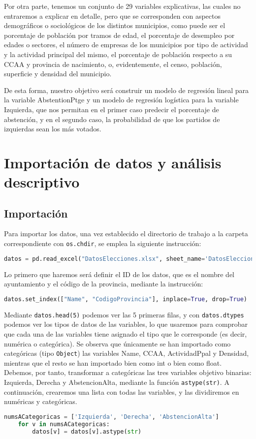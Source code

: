 \documentclass[a4paper,onecolumn]{extarticle}
\begin{document}
\begin{sloppypar}
Por otra parte, tenemos un conjunto de 29 variables explicativas, las cuales no entraremos a explicar en detalle, pero que se corresponden con aspectos 
demográficos o sociológicos de los distintos municipios, como puede ser el porcentaje de población por tramos de edad, el porcentaje de desempleo por edades 
o sectores, el número de empresas de los municipios por tipo de actividad y la actividad principal del mismo, el porcentaje de población respecto a su CCAA 
y provincia de nacimiento, o, evidentemente, el censo, población, superficie y densidad del municipio.

De esta forma, nuestro objetivo será construir un modelo de regresión lineal para la variable AbstentionPtge y un modelo de regresión logística para la 
variable Izquierda, que nos permitan en el primer caso predecir el porcentaje de abstención, y en el segundo caso, la probabilidad de que los partidos de 
izquierdas sean los más votados.

\section{Importación de datos y análisis descriptivo}\label{importacionAnalisis}
\subsection{Importación}\label{importacion}
Para importar los datos, una vez establecido el directorio de trabajo a la carpeta correspondiente con \texttt{os.chdir}, se emplea la siguiente instrucción:
\begin{lstlisting}[language=Python, numbers=none]
    datos = pd.read_excel("DatosElecciones.xlsx", sheet_name='DatosEleccionesEspaña')
\end{lstlisting}

Lo primero que haremos será definir el ID de los datos, que es el nombre del ayuntamiento y el código de la provincia, mediante la instrucción:
\begin{lstlisting}[language=Python,numbers=none]
datos.set_index(["Name", "CodigoProvincia"], inplace=True, drop=True)
\end{lstlisting}

Mediante \texttt{datos.head(5)} podemos ver las 5 primeras filas, y con \texttt{datos.dtypes} podemos ver los tipos de datos de las variables, lo que 
usaremos para comprobar que cada una de las variables tiene asignado el tipo que le corresponde (es decir, numérica o categórica). Se observa que únicamente
se han importado como categóricas (tipo \texttt{Object}) las variables Name, CCAA, ActividadPpal y Densidad, mientras que el resto se han importado bien 
como int o bien como float. Debemos, por tanto, transformar a categóricas las tres variables objetivo binarias: Izquierda, Derecha y AbstencionAlta, mediante 
la función \texttt{astype(str)}. A continuación, crearemos una lista con todas las variables, y las dividiremos en numéricas y categóricas.
\begin{lstlisting}[language=Python]
    numsACategoricas = ['Izquierda', 'Derecha', 'AbstencionAlta']
    for v in numsACategoricas:
        datos[v] = datos[v].astype(str)


\end{lstlisting}
\end{sloppypar}
\end{document}
